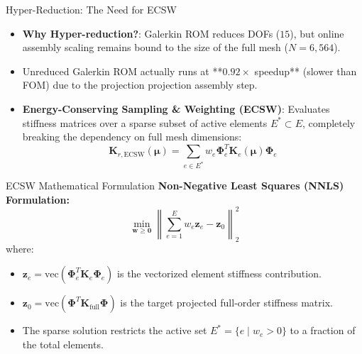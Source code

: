 \documentclass[aspectratio=169, 10pt]{beamer}
\begin{document}
\begin{frame}{Hyper-Reduction: The Need for ECSW}
    \begin{itemize}
        \item \textbf{Why Hyper-reduction?}: Galerkin ROM reduces DOFs ($15$), but online assembly scaling remains bound to the size of the full mesh ($N = 6,564$).
        \item Unreduced Galerkin ROM actually runs at **$0.92\times$ speedup** (slower than FOM) due to the projection projection assembly step.
        \item \textbf{Energy-Conserving Sampling \& Weighting (ECSW)}: Evaluates stiffness matrices over a sparse subset of active elements $E^* \subset E$, completely breaking the dependency on full mesh dimensions:
        \begin{equation*}
            \mathbf{K}_{r, \text{ECSW}}(\boldsymbol{\mu}) = \sum_{e \in E^*} w_e \boldsymbol{\Phi}_e^T \mathbf{K}_{e}(\boldsymbol{\mu}) \boldsymbol{\Phi}_e
        \end{equation*}
    \end{itemize}
\end{frame}

\begin{frame}{ECSW Mathematical Formulation}
    \textbf{Non-Negative Least Squares (NNLS) Formulation:}
    \begin{equation*}
        \min_{\mathbf{w} \geq \mathbf{0}} \left\| \sum_{e=1}^{E} w_e \mathbf{z}_e - \mathbf{z}_0 \right\|_2^2
    \end{equation*}
    where:
    \begin{itemize}
        \item $\mathbf{z}_e = \text{vec}(\boldsymbol{\Phi}_e^T \mathbf{K}_e \boldsymbol{\Phi}_e)$ is the vectorized element stiffness contribution.
        \item $\mathbf{z}_0 = \text{vec}(\boldsymbol{\Phi}^T \mathbf{K}_{\text{full}} \boldsymbol{\Phi})$ is the target projected full-order stiffness matrix.
        \item The sparse solution restricts the active set $E^* = \{ e \mid w_e > 0 \}$ to a fraction of the total elements.
    \end{itemize}
\end{frame}
\end{document}
